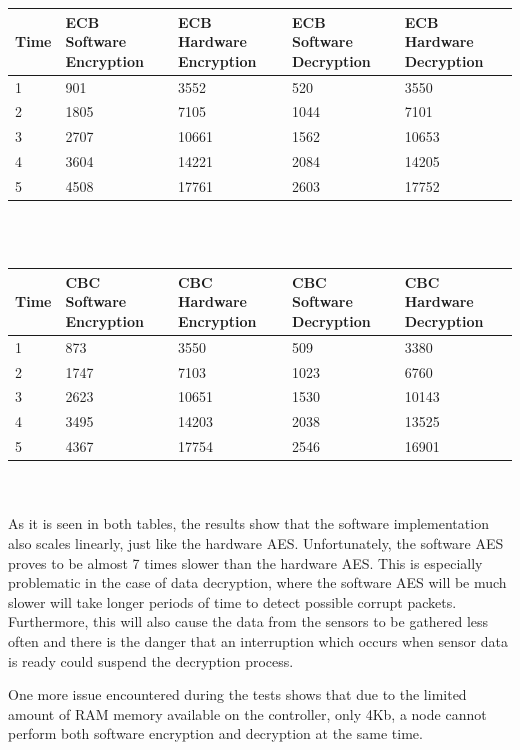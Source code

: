 \begin{tabular}{ | l | p{1.5cm} | p{1.5cm} | p{1.5cm} | p{1.5cm} |}
    \hline
    Time & ECB Software Encryption & ECB Hardware Encryption & ECB Software Decryption & ECB Hardware Decryption \\ \hline
    1 & 901 & 3552 & 520 & 3550 \\ \hline
    2 & 1805 & 7105 & 1044 & 7101 \\ \hline
    3 & 2707 & 10661 & 1562 & 10653\\ \hline
    4 & 3604 & 14221 & 2084 & 14205\\ \hline
    5 & 4508 & 17761 & 2603 & 17752\\ \hline
\end{tabular}\\\\

\begin{tabular}{ | l | p{1.5cm} | p{1.5cm} | p{1.5cm} | p{1.5cm} |}
    \hline
    Time & CBC Software Encryption & CBC Hardware Encryption & CBC Software Decryption & CBC Hardware Decryption \\ \hline
    1 & 873 & 3550 & 509 & 3380 \\ \hline
    2 & 1747 & 7103 & 1023 & 6760 \\ \hline
    3 & 2623 & 10651 & 1530 & 10143 \\ \hline
    4 & 3495 & 14203 & 2038 & 13525 \\ \hline
    5 & 4367 & 17754 & 2546 & 16901\\ \hline
\end{tabular}\\\\

As it is seen in both tables, the results show that the software implementation also 
scales linearly, just like the hardware AES. Unfortunately, the software AES proves to 
be almost 7 times slower than the hardware AES. This is especially problematic in the 
case of data decryption, where the software AES will be much slower will take longer 
periods of time to detect possible corrupt packets. Furthermore, this will also cause 
the data from the sensors to be gathered less often and there is the danger that 
an interruption which occurs when sensor data is ready could suspend the decryption 
process.

One more issue encountered during the tests shows that due to the limited amount of 
RAM memory available on the controller, only 4Kb, a node cannot perform both software 
encryption and decryption at the same time.

